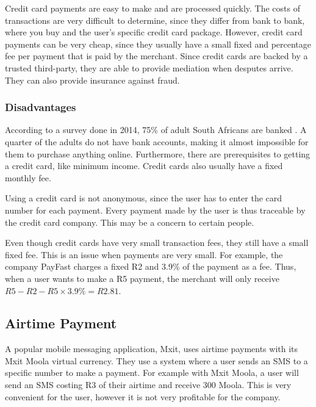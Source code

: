 Credit card payments are easy to make and are processed quickly. The costs of transactions are very difficult to determine, since they differ from bank to bank, where you buy and the user's specific credit card package. However, credit card payments can be very cheap, since they usually have a small fixed and percentage fee per payment that is paid by the merchant. Since credit cards are backed by a trusted third-party, they are able to provide mediation when desputes arrive. They can also provide insurance against fraud. 

\subsubsection{Disadvantages}

According to a survey done in 2014, 75\% of adult South Africans are banked \cite{finmark}. A quarter of the adults do not have bank accounts, making it almost impossible for them to purchase anything online. Furthermore, there are prerequisites to getting a credit card, like minimum income. Credit cards also usually have a fixed monthly fee.

Using a credit card is not anonymous, since the user has to enter the card number for each payment. Every payment made by the user is thus traceable by the credit card company. This may be a concern to certain people.

Even though credit cards have very small transaction fees, they still have a small fixed fee. This is an issue when payments are very small. For example, the company PayFast \cite{PayFast} charges a fixed R2 and 3.9\% of the payment as a fee. Thus, when a user wants to make a R5 payment, the merchant will only receive $R5 - R2 - R5 \times 3.9\% = R2.81$.


\subsection{Airtime Payment}

A popular mobile messaging application, Mxit, uses airtime payments with its Mxit Moola \cite{Mxit} virtual currency. They use a system where a user sends an SMS to a specific number to make a payment. For example with Mxit Moola, a user will send an SMS costing R3 of their airtime and receive 300 Moola. This is very convenient for the user, however it is not very profitable for the company.

